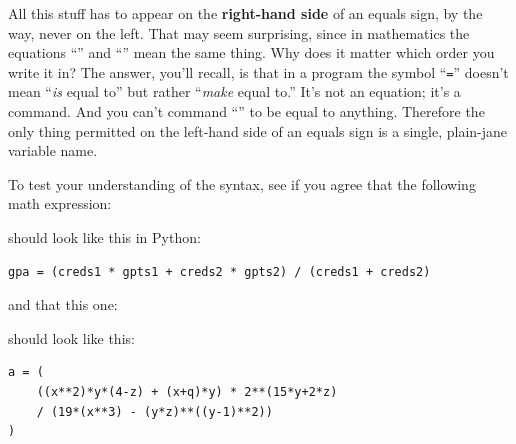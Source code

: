 All this stuff has to appear on the \textbf{right-hand side} of an equals sign,
by the way, never on the left. That may seem surprising, since in mathematics
the equations ``'' and ``'' mean the same thing. Why does
it matter which order you write it in? The answer, you'll recall, is that in a
program the symbol ``\texttt{=}'' doesn't mean ``\textit{is} equal to'' but
rather ``\textit{make} equal to.'' It's not an equation; it's a command. And
you can't command ``'' to be equal to anything. Therefore the only thing
permitted on the left-hand side of an equals sign is a single, plain-jane
variable name.

To test your understanding of the syntax, see if you agree that the following
math expression:


should look like this in Python:

\begin{Verbatim}[fontsize=\footnotesize,samepage=true,frame=single,framesep=3mm]
gpa = (creds1 * gpts1 + creds2 * gpts2) / (creds1 + creds2)
\end{Verbatim}

and that this one:


should look like this:

\begin{Verbatim}[fontsize=\CBCodeSmall,samepage=true,frame=single,framesep=3mm]
a = (
    ((x**2)*y*(4-z) + (x+q)*y) * 2**(15*y+2*z)
    / (19*(x**3) - (y*z)**((y-1)**2))
)
\end{Verbatim}

